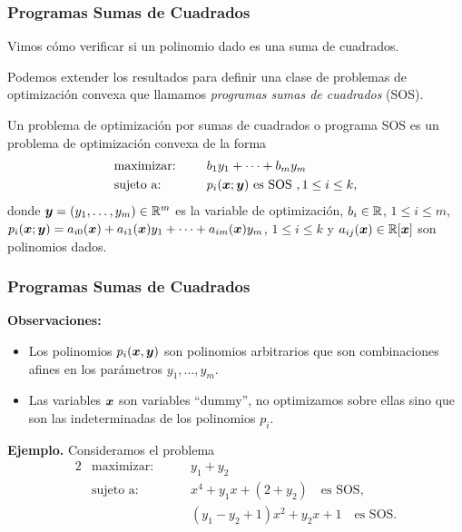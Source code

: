\documentclass[aspectratio=169,12pt,spanish]{beamer}
\begin{document}
\begin{frame}

\frametitle{Programas Sumas de Cuadrados}

Vimos cómo verificar si un polinomio dado es una suma de cuadrados.

Podemos extender los resultados para definir una clase de problemas de optimización convexa que llamamos \emph{programas sumas de cuadrados} (SOS).

\begin{definition}
Un problema de optimización por sumas de cuadrados o programa SOS es un problema de optimización convexa de la forma
\begin{alignat*}{2}
  & \text{maximizar: } & & b_1 y_1 + \dots + b_m y_m  \\
   & \text{sujeto a: } & \quad & p_i(\bm{x}; \bm{y}) \text{ es SOS }, 1 \le i \le k,
\end{alignat*}
donde $\bm{y} = (y_1, \dots, y_m) \in \mathbb{R}^m$ es la variable de optimización, $b_i \in \mathbb{R}$, $1 \le i \le m$, $p_i(\bm{x}; \bm{y}) = a_{i0}(\bm{x}) + a_{i1}(\bm{x}) y_1 + \dots + a_{im}(\bm{x}) y_m$, $1 \le i \le k$ y $a_{ij}(\bm{x}) \in \mathbb{R}[\bm{x}]$ son polinomios dados.
\end{definition}



\end{frame}


\begin{frame}

\frametitle{Programas Sumas de Cuadrados}

\textbf{Observaciones:}
\begin{itemize}
\item Los polinomios $p_i(\bm{x}, \bm{y})$ son polinomios arbitrarios que son combinaciones afines en los parámetros $y_1, \dots, y_m$.
\item Las variables $\bm{x}$ son variables ``dummy'', no optimizamos sobre ellas sino que son las indeterminadas de los polinomios $p_i$.
\end{itemize}

\textbf{Ejemplo.}
Consideramos el problema
\begin{alignat*}{2}
  & \text{maximizar: } & & y_1 + y_2  \\
  & \text{sujeto a: } & \quad & x^4 + y_1 x + (2 + y_2) \quad \text{es SOS,} \\
  &  & \quad & (y_1 - y_2 + 1)x^2 + y_2 x + 1 \quad  \text{es SOS.}
\end{alignat*}

\end{frame}
\end{document}

